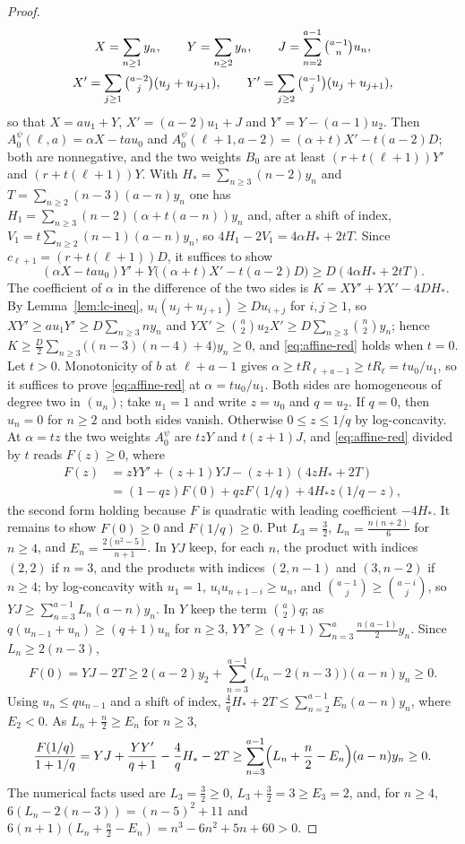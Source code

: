 \begin{proof}
\[\begin{gathered}
X=\sum_{n\geq1}y_n,\qquad Y=\sum_{n\geq2}y_n,\qquad J=\sum_{n=2}^{a-1}\tbinom{a-1}nu_n,\\
X'=\sum_{j\geq1}\tbinom{a-2}j(u_j+u_{j+1}),\qquad Y'=\sum_{j\geq2}\tbinom{a-1}j(u_j+u_{j+1}),
\end{gathered}
\]
so that $X=au_1+Y$, $X'=(a-2)u_1+J$ and $Y'=Y-(a-1)u_2$. Then $A^\psi_0(\ell,a)=\alpha X-tau_0$ and $A^\psi_0(\ell+1,a-2)=(\alpha+t)X'-t(a-2)D$; both are nonnegative, and the two weights $B_0$ are at least $(r+t(\ell+1))Y'$ and $(r+t(\ell+1))Y$. With $H_*=\sum_{n\geq3}(n-2)y_n$ and $T=\sum_{n\geq2}(n-3)(a-n)y_n$ one has $H_1=\sum_{n\geq3}(n-2)(\alpha+t(a-n))y_n$ and, after a shift of index, $V_1=t\sum_{n\geq2}(n-1)(a-n)y_n$, so $4H_1-2V_1=4\alpha H_*+2tT$. Since $c_{\ell+1}=(r+t(\ell+1))D$, it suffices to show
\begin{equation}\label{eq:affine-red}
(\alpha X-tau_0)Y'+Y\bigl((\alpha+t)X'-t(a-2)D\bigr)\geq D(4\alpha H_*+2tT).
\end{equation}
The coefficient of $\alpha$ in the difference of the two sides is $K=XY'+YX'-4DH_*$. By Lemma~\ref{lem:lc-ineq}, $u_i(u_j+u_{j+1})\geq Du_{i+j}$ for $i,j\geq1$, so $XY'\geq au_1Y'\geq D\sum_{n\geq3}ny_n$ and $YX'\geq\binom a2u_2X'\geq D\sum_{n\geq3}\binom n2y_n$; hence $K\geq\frac D2\sum_{n\geq3}\bigl((n-3)(n-4)+4\bigr)y_n\geq0$, and \eqref{eq:affine-red} holds when $t=0$. Let $t>0$. Monotonicity of $b$ at $\ell+a-1$ gives $\alpha\geq tR_{\ell+a-1}\geq tR_\ell=tu_0/u_1$, so it suffices to prove \eqref{eq:affine-red} at $\alpha=tu_0/u_1$. Both sides are homogeneous of degree two in $(u_n)$; take $u_1=1$ and write $z=u_0$ and $q=u_2$. If $q=0$, then $u_n=0$ for $n\geq2$ and both sides vanish. Otherwise $0\leq z\leq1/q$ by log-concavity. At $\alpha=tz$ the two weights $A^\psi_0$ are $tzY$ and $t(z+1)J$, and \eqref{eq:affine-red} divided by $t$ reads $F(z)\geq0$, where
\[
\begin{aligned}
F(z)&=zYY'+(z+1)YJ-(z+1)(4zH_*+2T)\\
&=(1-qz)F(0)+qzF(1/q)+4H_*z(1/q-z),
\end{aligned}
\]
the second form holding because $F$ is quadratic with leading coefficient $-4H_*$. It remains to show $F(0)\geq0$ and $F(1/q)\geq0$. Put $L_3=\frac32$, $L_n=\frac{n(n+2)}6$ for $n\geq4$, and $E_n=\frac{2(n^2-5)}{n+1}$. In $YJ$ keep, for each $n$, the product with indices $(2,2)$ if $n=3$, and the products with indices $(2,n-1)$ and $(3,n-2)$ if $n\geq4$; by log-concavity with $u_1=1$, $u_iu_{n+1-i}\geq u_n$, and $\binom{a-1}j\geq\binom{a-i}j$, so $YJ\geq\sum_{n=3}^{a-1}L_n(a-n)y_n$. In $Y$ keep the term $\binom a2q$; as $q(u_{n-1}+u_n)\geq(q+1)u_n$ for $n\geq3$, $YY'\geq(q+1)\sum_{n=3}^a\frac{n(a-1)}2y_n$. Since $L_n\geq2(n-3)$,
\[
F(0)=YJ-2T\geq2(a-2)y_2+\sum_{n=3}^{a-1}\bigl(L_n-2(n-3)\bigr)(a-n)y_n\geq0.
\]
Using $u_n\leq qu_{n-1}$ and a shift of index, $\frac4qH_*+2T\leq\sum_{n=2}^{a-1}E_n(a-n)y_n$, where $E_2<0$. As $L_n+\frac n2\geq E_n$ for $n\geq3$,
\[
\frac{F(1/q)}{1+1/q}=YJ+\frac{YY'}{q+1}-\frac4qH_*-2T\geq\sum_{n=3}^{a-1}\Bigl(L_n+\frac n2-E_n\Bigr)(a-n)y_n\geq0.
\]
The numerical facts used are $L_3=\frac32\geq0$, $L_3+\frac32=3\geq E_3=2$, and, for $n\geq4$, $6(L_n-2(n-3))=(n-5)^2+11$ and $6(n+1)(L_n+\frac n2-E_n)=n^3-6n^2+5n+60>0$.


\end{proof}
